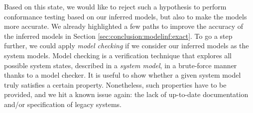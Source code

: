 Based on this state, we would like to reject such a hypothesis to
perform conformance testing based on our inferred models, but
also to make the models more accurate. We already highlighted a
few paths to improve the accuracy of the inferred models in
Section \ref{sec:conclusion:modelinf:exact}. To go a step
further, we could apply \emph{model checking}
\cite{baier2008principles} if we consider our inferred models as
the system models. Model checking is a verification technique
that explores all possible system states, described in a
\textit{system model}, in a brute-force manner thanks to a model
checker. It is useful to show whether a given system model truly
satisfies a certain property.  Nonetheless, such properties have
to be provided, and we hit a known issue again: the lack of
up-to-date documentation and/or specification of legacy systems.

